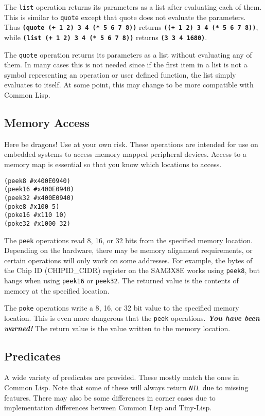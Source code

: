 \documentclass[10pt, openany]{book}
\newcommand{\operation}[1]{\textbf{\texttt{#1}}}
\newcommand{\function}[1]{\texttt{#1}}
\newcommand{\constant}[1]{\emph{\texttt{#1}}}
\newcommand{\tl}{Tiny-Lisp}
\newcommand{\cl}{Common Lisp}
\begin{document}
The \function{list} operation returns its parameters as a list after evaluating each of them.  This is similar to \function{quote} except that quote does not evaluate the parameters.  Thus \operation{(quote (+ 1 2) 3 4 (* 5 6 7 8))} returns \operation{((+ 1 2) 3 4 (* 5 6 7 8))}, while \operation{(list (+ 1 2) 3 4 (* 5 6 7 8))} returns \operation{(3 3 4 1680)}.

The \function{quote} operation returns its parameters as a list without evaluating any of them.  In many cases this is not needed since if the first item in a list is not a symbol representing an operation or user defined function, the list simply evaluates to itself.  At some point, this may change to be more compatible with \cl.

\subsection{Memory Access}
Here be dragons!  Use at your own risk.  These operations are intended for use on embedded systems to access memory mapped peripheral devices.  Access to a memory map is essential so that you know which locations to access.
\begin{lstlisting}
(peek8 #x400E0940)
(peek16 #x400E0940)
(peek32 #x400E0940)
(poke8 #x100 5)
(poke16 #x110 10)
(poke32 #x1000 32)
\end{lstlisting}

The \function{peek} operations read 8, 16, or 32 bits from the specified memory location.  Depending on the hardware, there may be memory alignment requirements, or certain operations will only work on some addresses.  For example, the bytes of the Chip ID (CHIPID\_CIDR) register on the SAM3X8E works using \function{peek8}, but hangs when using \function{peek16} or \function{peek32}.  The returned value is the contents of memory at the specified location.

The \function{poke} operations write a 8, 16, or 32 bit value to the specified memory location.  This is even more dangerous that the \function{peek} operations.  \textbf{\textit{You have been warned!}}  The return value is the value written to the memory location.

\subsection{Predicates}
A wide variety of predicates are provided.  These mostly match the ones in \cl{}.  Note that some of these will always return \constant{NIL} due to missing features.  There may also be some differences in corner cases due to implementation differences between \cl{} and \tl.
\end{document}
